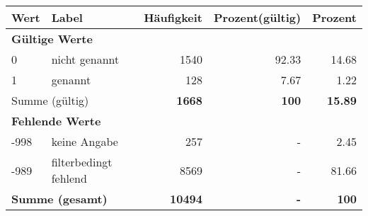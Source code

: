      \begin{longtable}{lXrrr}
     \toprule
     \textbf{Wert} & \textbf{Label} & \textbf{Häufigkeit} & \textbf{Prozent(gültig)} & \textbf{Prozent} \\
     \endhead
     \midrule
     \multicolumn{5}{l}{\textbf{Gültige Werte}}\\

     0 &
     \multicolumn{1}{X}{ nicht genannt   } &


       \num{1540} &
       \num[round-mode=places,round-precision=2]{92.33} &
         \num[round-mode=places,round-precision=2]{14.68} \\

     1 &
     \multicolumn{1}{X}{ genannt   } &


       \num{128} &
       \num[round-mode=places,round-precision=2]{7.67} &
         \num[round-mode=places,round-precision=2]{1.22} \\
     \midrule
     \multicolumn{2}{l}{Summe (gültig)} &
       \textbf{\num{1668}} &
     \textbf{\num{100}} &
       \textbf{\num[round-mode=places,round-precision=2]{15.89}} \\
     \multicolumn{5}{l}{\textbf{Fehlende Werte}}\\
       -998 &
       keine Angabe &
         \num{257} &
        - &
         \num[round-mode=places,round-precision=2]{2.45} \\
       -989 &
       filterbedingt fehlend &
         \num{8569} &
        - &
         \num[round-mode=places,round-precision=2]{81.66} \\
     \midrule
     \multicolumn{2}{l}{\textbf{Summe (gesamt)}} &
          \textbf{\num{10494}} &
        \textbf{-} &
        \textbf{\num{100}} \\
     \bottomrule
     \end{longtable}
     
